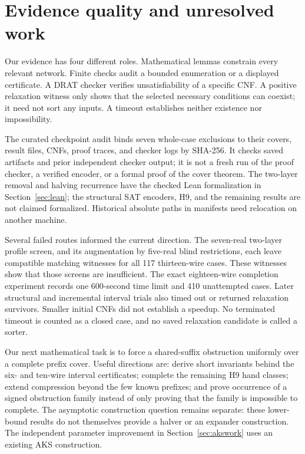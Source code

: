 \documentclass[11pt]{article}
\begin{document}
\section{Evidence quality and unresolved work}\label{sec:limits}
Our evidence has four different roles. Mathematical lemmas constrain every relevant network. Finite checks audit a bounded enumeration or a displayed certificate. A DRAT checker verifies unsatisfiability of a specific CNF. A positive relaxation witness only shows that the selected necessary conditions can coexist; it need not sort any inputs. A timeout establishes neither existence nor impossibility.

The curated checkpoint audit binds seven whole-case exclusions to their covers, result files, CNFs, proof traces, and checker logs by SHA-256. It checks saved artifacts and prior independent checker output; it is not a fresh run of the proof checker, a verified encoder, or a formal proof of the cover theorem. The two-layer removal and halving recurrence have the checked Lean formalization in Section~\ref{sec:lean}; the structural SAT encoders, H9, and the remaining results are not claimed formalized. Historical absolute paths in manifests need relocation on another machine.

Several failed routes informed the current direction. The seven-real two-layer profile screen, and its augmentation by five-real blind restrictions, each leave compatible matching witnesses for all 117 thirteen-wire cases. These witnesses show that those screens are insufficient. The exact eighteen-wire completion experiment records one 600-second time limit and 410 unattempted cases. Later structural and incremental interval trials also timed out or returned relaxation survivors. Smaller initial CNFs did not establish a speedup. No terminated timeout is counted as a closed case, and no saved relaxation candidate is called a sorter.

Our next mathematical task is to force a shared-suffix obstruction uniformly over a complete prefix cover. Useful directions are: derive short invariants behind the six- and ten-wire interval certificates; complete the remaining H9 hand classes; extend compression beyond the few known prefixes; and prove occurrence of a signed obstruction family instead of only proving that the family is impossible to complete. The asymptotic construction question remains separate: these lower-bound results do not themselves provide a halver or an expander construction. The independent parameter improvement in Section~\ref{sec:akswork} uses an existing AKS construction.
\end{document}
